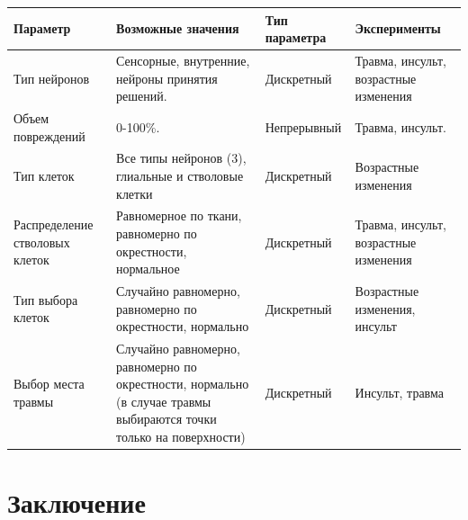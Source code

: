 \documentclass{spbau-diploma}
\begin{document}
\begin{table}
\centering
    \begin{tabular}{ | p{2.5cm} | p{3.5cm} | p{3cm} | p{4cm} |}
    \hline
    Параметр & Возможные значения & Тип параметра & Эксперименты \\ \hline
    Тип нейронов & Сенсорные, внутренние, нейроны принятия решений. & Дискретный & Травма, инсульт, возрастные изменения \\ \hline
    Объем повреждений & 0-100\%. & Непрерывный & Травма, инсульт. \\ \hline
    Тип клеток & Все типы нейронов (3), глиальные и стволовые клетки & Дискретный & Возрастные изменения \\ \hline
    Распределение стволовых клеток & Равномерное по ткани, равномерно по окрестности, нормальное & Дискретный & Травма, инсульт, возрастные изменения \\ \hline
    Тип выбора клеток & Случайно равномерно, равномерно по окрестности, нормально & Дискретный & Возрастные изменения, инсульт \\ \hline
    Выбор места травмы & Случайно равномерно, равномерно по окрестности, нормально (в случае травмы выбираются точки только на поверхности) & Дискретный & Инсульт, травма \\ \hline
    \end{tabular}
    \label{tab:exp_params}
\end{table}






\section*{Заключение}




\end{document}
